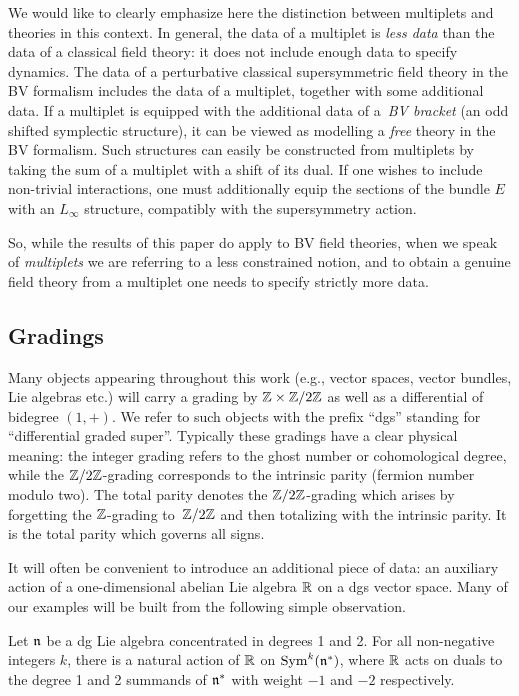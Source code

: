 \documentclass[pdftex]{sigma}
\numberwithin{equation}{section}
\DeclareMathOperator{\Sym}{Sym}
\begin{document}
\begin{rmk}
	We would like to clearly emphasize here the distinction between multiplets and theories in this context. In general, the data of a multiplet is \emph{less data} than the data of a classical field theory: it does not include enough data to specify dynamics. The data of a perturbative classical supersymmetric field theory in the BV formalism includes the data of a multiplet, together with some additional data. If a multiplet is equipped with the additional data of a~\emph{BV bracket} (an odd shifted symplectic structure), it can be viewed as modelling a \emph{free} theory in the BV formalism. Such structures can easily be constructed from multiplets by taking the sum of a multiplet with a shift of its dual.	If one wishes to include non-trivial interactions, one must additionally equip the sections of the bundle $E$ with an $L_\infty$ structure, compatibly with the supersymmetry action.
	
	So, while the results of this paper do apply to BV field theories, when we speak of \emph{multiplets} we are referring to a less constrained notion, and to obtain a genuine field theory from a multiplet one needs to specify strictly more data.
\end{rmk}

\subsection{Gradings}
\label{ssec:gradings}
Many objects appearing throughout this work (e.g., vector spaces, vector bundles, Lie algebras etc.) will carry a grading by $\mathbb Z\times \mathbb Z/2\mathbb Z$ as well as a differential of bidegree $(1,+)$. We refer to such objects with the prefix ``dgs'' standing for ``differential graded super''. Typically these gradings have a clear physical meaning: the integer grading refers to the ghost number or cohomological degree, while the $\mathbb Z/2\mathbb Z$-grading corresponds to the intrinsic parity (fermion number modulo two). The total parity denotes the $\mathbb Z/2\mathbb Z$-grading which arises by forgetting the $\mathbb Z$-grading to~$\mathbb Z/2\mathbb Z$ and then totalizing with the intrinsic parity. It is the total parity which governs all signs.

It will often be convenient to introduce an additional piece of data: an auxiliary action of a one-dimensional abelian Lie algebra $\mathbb R$ on a dgs vector space. Many of our examples will be built from the following simple observation.

\begin{eg}
	Let $\mathfrak n$ be a dg Lie algebra concentrated in degrees 1 and 2. For all non-negative integers $k$, there is a natural action of $\mathbb R$ on $\Sym^k(\fn^*)$, where $\mathbb R$ acts on duals to the degree 1 and 2 summands of $\mathfrak n^*$ with weight $-1$ and $-2$ respectively.
\end{eg}
\end{document}

